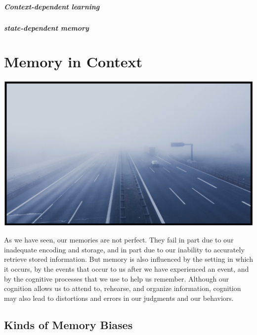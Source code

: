 \documentclass[
]{krantz}
\begin{document}
\hypertarget{context-dependent-learning}{%
\paragraph*{Context-dependent learning}\label{context-dependent-learning}}

\hypertarget{state-dependent-memory}{%
\paragraph*{state-dependent memory}\label{state-dependent-memory}}

\hypertarget{memory-in-context}{%
\chapter{Memory in Context}\label{memory-in-context}}

\begin{center}\includegraphics[width=1\linewidth]{images/ch6/fig0} \end{center}

As we have seen, our memories are not perfect. They fail in part due to our inadequate encoding and storage, and in part due to our inability to accurately retrieve stored information. But memory is also influenced by the setting in which it occurs, by the events that occur to us after we have experienced an event, and by the cognitive processes that we use to help us remember. Although our cognition allows us to attend to, rehearse, and organize information, cognition may also lead to distortions and errors in our judgments and our behaviors.

\hypertarget{kinds-of-memory-biases}{%
\section{Kinds of Memory Biases}\label{kinds-of-memory-biases}}
\end{document}
